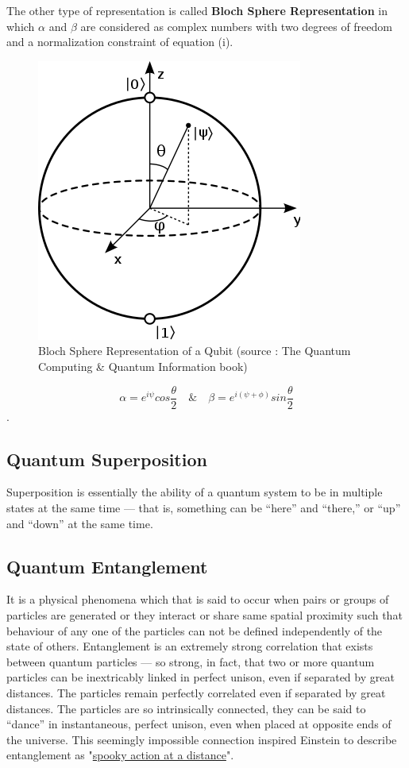 The other type of representation is called \textbf{Bloch Sphere Representation} in which $\alpha$ and $\beta$ are considered as complex numbers with two degrees of freedom and a normalization constraint of equation (i). 

\begin{figure}[!htb]
\centering
  \includegraphics[scale=0.5]{bloch}
  \caption{Bloch Sphere Representation of a Qubit (source : The Quantum Computing \& Quantum Information book)}
\end{figure}

\[\alpha =  e^{i\psi}cos\dfrac{\theta}{2} \quad \& \quad \beta = e^{i(\psi + \phi)}sin\dfrac{\theta}{2} \].

\subsection{Quantum Superposition}
Superposition is essentially the ability of a quantum system to be in multiple states at the same time — that is, something can be “here” and “there,” or “up” and “down” at the same time.

\subsection{Quantum Entanglement}
It is a physical phenomena which that is said to occur when pairs or groups of particles are generated or they interact or share same spatial proximity such that behaviour of any one of the particles can not be defined independently of the state of others. Entanglement is an extremely strong correlation that exists between quantum particles — so strong, in fact, that two or more quantum particles can be inextricably linked in perfect unison, even if separated by great distances. The particles remain perfectly correlated even if separated by great distances. The particles are so intrinsically connected, they can be said to “dance” in instantaneous, perfect unison, even when placed at opposite ends of the universe. This seemingly impossible connection inspired Einstein to describe entanglement as "\underline{spooky action at a distance}".

